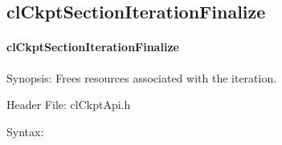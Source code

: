 \begin{flushleft}
\subsection{clCkptSectionIterationFinalize}
\hypertarget{pageckpt115}{}\paragraph{cl\-Ckpt\-Section\-Iteration\-Finalize}\label{pageckpt115}
\begin{Desc}
\item[Synopsis:]Frees resources associated with the iteration.\end{Desc}
\begin{Desc}



\item[Header File:]clCkptApi.h\end{Desc}
\begin{Desc}
\item[Syntax:]


\end{Desc}
\end{flushleft}
